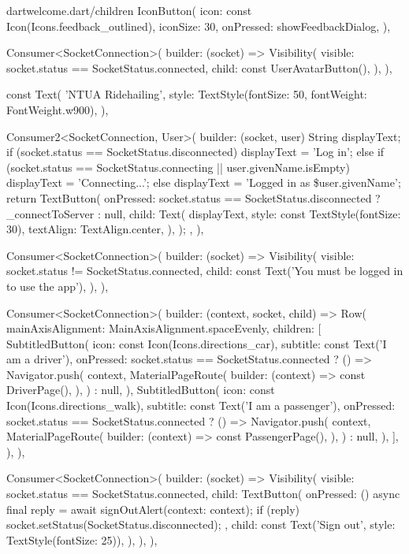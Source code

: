 \documentclass[../thesis.tex]{subfiles}
\begin{document}
\begin{codeblock}{dart}{welcome.dart/children}
  IconButton(
    icon: const Icon(Icons.feedback_outlined),
    iconSize: 30,
    onPressed: showFeedbackDialog,
  ),

  Consumer<SocketConnection>(
    builder: (socket) => Visibility(
      visible: socket.status == SocketStatus.connected,
      child: const UserAvatarButton(),
    ),
  ),

  const Text(
    'NTUA Ridehailing',
    style: TextStyle(fontSize: 50, fontWeight: FontWeight.w900),
  ),

  Consumer2<SocketConnection, User>(
    builder: (socket, user) {
      String displayText;
      if (socket.status == SocketStatus.disconnected) {
        displayText = 'Log in';
      } else if (socket.status == SocketStatus.connecting ||
          user.givenName.isEmpty) {
        displayText = 'Connecting...';
      } else {
        displayText = 'Logged in as \${user.givenName}';
      }
      return TextButton(
        onPressed: socket.status == SocketStatus.disconnected
            ? _connectToServer
            : null,
        child: Text(
          displayText,
          style: const TextStyle(fontSize: 30),
          textAlign: TextAlign.center,
        ),
      );
    },
  ),

  Consumer<SocketConnection>(
    builder: (socket) => Visibility(
      visible: socket.status != SocketStatus.connected,
      child: const Text('You must be logged in to use the app'),
    ),
  ),

  Consumer<SocketConnection>(
    builder: (context, socket, child) => Row(
      mainAxisAlignment: MainAxisAlignment.spaceEvenly,
      children: [
        SubtitledButton(
          icon: const Icon(Icons.directions_car),
          subtitle: const Text('I am a driver'),
          onPressed: socket.status == SocketStatus.connected
              ? () => Navigator.push(
                context,
                MaterialPageRoute(
                  builder: (context) => const DriverPage(),
                ),
              )
              : null,
        ),
        SubtitledButton(
          icon: const Icon(Icons.directions_walk),
          subtitle: const Text('I am a passenger'),
          onPressed: socket.status == SocketStatus.connected
              ? () => Navigator.push(
                context,
                MaterialPageRoute(
                  builder: (context) => const PassengerPage(),
                ),
              )
              : null,
        ),
      ],
    ),
  ),

  Consumer<SocketConnection>(
    builder: (socket) => Visibility(
      visible: socket.status == SocketStatus.connected,
      child: TextButton(
        onPressed: () async {
          final reply = await signOutAlert(context: context);
          if (reply) socket.setStatus(SocketStatus.disconnected);
        },
        child: const Text('Sign out', style: TextStyle(fontSize: 25)),
      ),
    ),
  ),
\end{codeblock}
\end{document}
